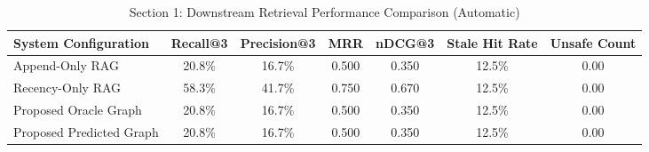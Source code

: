 
\begin{table}[htbp]
\centering
\caption{Section 1: Downstream Retrieval Performance Comparison (Automatic)}
\label{tab:retrieval_comparison}
\begin{tabular}{lcccccc}
\hline
\textbf{System Configuration} & \textbf{Recall@3} & \textbf{Precision@3} & \textbf{MRR} & \textbf{nDCG@3} & \textbf{Stale Hit Rate} & \textbf{Unsafe Count} \\ \hline
Append-Only RAG & 20.8\% & 16.7\% & 0.500 & 0.350 & 12.5\% & 0.00 \\
Recency-Only RAG & 58.3\% & 41.7\% & 0.750 & 0.670 & 12.5\% & 0.00 \\
Proposed Oracle Graph & 20.8\% & 16.7\% & 0.500 & 0.350 & 12.5\% & 0.00 \\
Proposed Predicted Graph & 20.8\% & 16.7\% & 0.500 & 0.350 & 12.5\% & 0.00 \\ \hline
\end{tabular}
\end{table}
